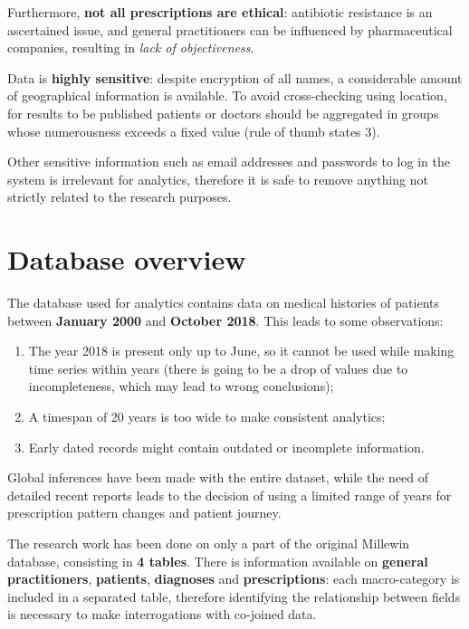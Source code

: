 Furthermore, \textbf{not all prescriptions are ethical}: antibiotic resistance is an ascertained issue, and general practitioners can be influenced by pharmaceutical companies, resulting in \textit{lack of objectiveness}.

Data is \textbf{highly sensitive}: despite encryption of all names, a considerable amount of geographical information is available. To avoid cross-checking using location, for results to be published patients or doctors should be aggregated in groups whose numerousness exceeds a fixed value (rule of thumb states 3). 

Other sensitive information such as email addresses and passwords to log in the system is irrelevant for analytics, therefore it is safe to remove anything not strictly related to the research purposes.

\section{Database overview}
The database used for analytics contains data on medical histories of patients between \textbf{January 2000} and \textbf{October 2018}. This leads to some observations:
\begin{enumerate}
	\item The year 2018 is present only up to June, so it cannot be used while making time series within years (there is going to be a drop of values due to incompleteness, which may lead to wrong conclusions);
	\item A timespan of 20 years is too wide to make consistent analytics;
	\item Early dated records might contain outdated or incomplete information.
\end{enumerate}

Global inferences have been made with the entire dataset, while the need of detailed recent reports leads to the decision of using a limited range of years for prescription pattern changes and patient journey.

The research work has been done on only a part of the original Millewin database, consisting in \textbf{4 tables}. There is information available on \textbf{general practitioners}, \textbf{patients}, \textbf{diagnoses} and \textbf{prescriptions}: each macro-category is included in a separated table, therefore identifying the relationship between fields is necessary to make interrogations with co-joined data.

